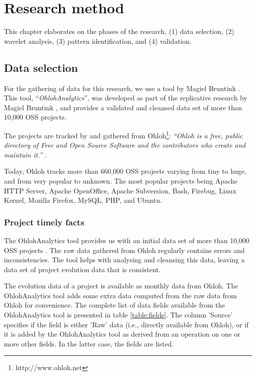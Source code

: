 \chapter{Research method}
\label{method}

This chapter elaborates on the phases of the research, (1) data selection, (2)
wavelet analysis, (3) pattern identification, and (4) validation.

\section{Data selection}
\label{method:data}

For the gathering of data for this research, we use a tool by Magiel Bruntink
\cite{ohlohanalytics}. This tool, ``\emph{OhlohAnalytics}\rm'', was developed as
part of the replicative research by Magiel Bruntink \cite{bruntink2014}, and
provides a validated and cleansed data set of more than 10,000 OSS projects.

The projects are tracked by and gathered from
Ohloh\footnote{http://www.ohloh.net}: \emph{``Ohloh is a free, public directory
of Free and Open Source Software and the contributors who create and maintain
it.'' }\rm \cite{ohloh}.

Today, Ohloh tracks more than 660,000 OSS projects varying from tiny to huge,
and from very popular to unknown. The most popular projects being Apache HTTP
Server, Apache OpenOffice, Apache Subversion, Bash, Firebug, Linux Kernel,
Mozilla Firefox, MySQL, PHP, and Ubuntu.

\subsection{Project timely facts}
The OhlohAnalytics tool provides us with an initial data set of more than
10,000 OSS projects \cite{bruntink2014}. The raw data gathered from Ohloh
regularly contains errors and inconsistencies. The tool helps with analysing
and cleansing this data, leaving a data set of project evolution data that is
consistent.

The evolution data of a project is available as monthly data from Ohloh. The
OhlohAnalytics tool adds some extra data computed from the raw data from Ohloh
for convenience. The complete list of data fields available from the
OhlohAnalytics tool is presented in table \ref{table:fields}. The column
'Source' specifies if the field is either 'Raw' data (i.e., directly available
from Ohloh), or if it is added by the OhlohAnalytics tool as derived from an
operation on one or more other fields. In the latter case, the fields are
listed.

